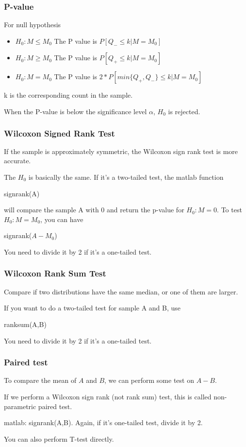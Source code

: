\documentclass{beamer}
\begin{document}
\begin{frame}
    \frametitle{P-value}

    For null hypothesis
    \begin{itemize}
        \item $H_0: M\leq M_0$ The P value is $P[Q_{-}\leq k|M=M_0]$
        \item $H_0: M\geq M_0$ The P value is $P[Q_{+}\leq k|M=M_0]$
        \item $H_0: M= M_0$ The P value is $2*P[min\{Q_{+},Q_{-}\}\leq k|M=M_0]$
    \end{itemize}
    k is the corresponding count in the sample.\par
    When the P-value is below the significance level $\alpha$, $H_0$ is rejected.

\end{frame}

\begin{frame}
    \frametitle{Wilcoxon Signed Rank Test}

    If the sample is approximately symmetric, the Wilcoxon sign rank test is more accurate.\par

    The $H_0$ is basically the same. If it's a two-tailed test, the matlab function\par
    signrank(A)\par
    will compare the sample A with 0 and return the p-value for $H_0: M=0$. To test $H_0: M=M_0$, you can have\par
    signrank($A-M_0$)\par
    You need to divide it by 2 if it's a one-tailed test.\par


\end{frame}

\begin{frame}
    \frametitle{Wilcoxon Rank Sum Test}

    Compare if two distributions have the same median, or one of them are larger.\par
    If you want to do a two-tailed test for sample A and B, use\par
    ranksum(A,B)\par
    You need to divide it by 2 if it's a one-tailed test.

\end{frame}

\begin{frame}
    \frametitle{Paired test}

    To compare the mean of $A$ and $B$, we can perform some test on $A-B$.\par
    If we perform a Wilcoxon sign rank (not rank sum) test, this is called non-parametric paired test.\par
    matlab: signrank(A,B). Again, if it's one-tailed test, divide it by 2.\par
    You can also perform T-test directly. 

\end{frame}
\end{document}
